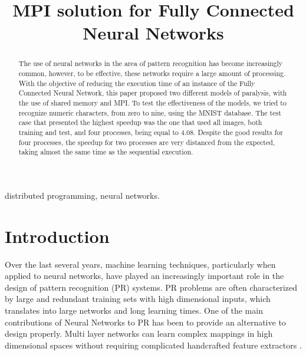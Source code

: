 \documentclass[conference]{IEEEtran}
\begin{document}
%
\title{MPI solution for Fully Connected Neural Networks}

\author{
}

\maketitle

\begin{abstract}
\boldmath
The use of neural networks in the area of pattern recognition has become increasingly common, however, to be effective, these networks require a large amount of processing. With the objective of reducing the execution time of an instance of the Fully Connected Neural Network, this paper proposed two different models of paralysis, with the use of shared memory and MPI. To test the effectiveness of the models, we tried to recognize numeric characters, from zero to nine, using the MNIST database. The test case that presented the highest speedup was the one that used all images, both training and test, and four processes, being equal to 4.08. Despite the good results for four processes, the speedup for two processes are very distanced from the expected, taking almost the same time as the sequential execution.
\end{abstract}

\begin{IEEEkeywords}
distributed programming, neural networks.
\end{IEEEkeywords}

\IEEEpeerreviewmaketitle

\section{Introduction}
Over the last several years, machine learning techniques, particularly when applied to neural networks, have played an increasingly important role in the design of pattern recognition (PR) systems. PR problems are often characterized by large and redundant training sets with high dimensional inputs, which translates into large networks and long learning times. One of the main contributions of Neural Networks to PR has been to provide an alternative to design properly. Multi layer networks can learn complex mappings in high dimensional spaces without requiring complicated handcrafted feature extractors \cite{lecun1995pattern}.
\end{document}
